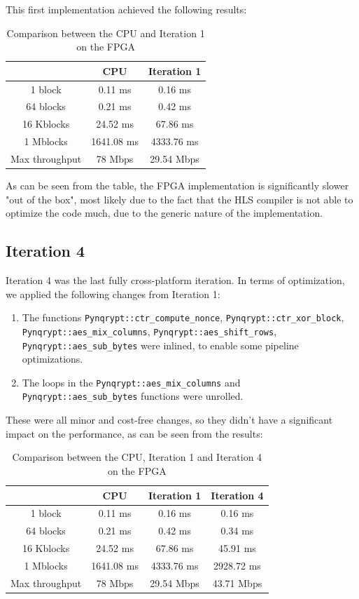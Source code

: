 \documentclass[12pt,oneside,a4paper]{article}
\begin{document}
This first implementation achieved the following results:
\begin{table}[h!]
	\centering
	\begin{tabular}{ccc}
		\toprule
		 & CPU & Iteration 1 \\
		\midrule
		1 block & 0.11 ms & 0.16 ms \\
		64 blocks & 0.21 ms & 0.42 ms \\
		16 Kblocks & 24.52 ms & 67.86 ms \\
		1 Mblocks & 1641.08 ms & 4333.76 ms \\
		Max throughput & 78 Mbps & 29.54 Mbps \\
		\bottomrule
	\end{tabular}
	\caption{Comparison between the CPU and Iteration 1 on the FPGA}
\end{table}

As can be seen from the table, the FPGA implementation is significantly slower "out of the box", most likely due to the fact that the HLS compiler is not able to optimize the code much, due to the generic nature of the implementation.  

\subsection{Iteration 4} \label{subsec:iter4}
Iteration 4 was the last fully cross-platform iteration.
In terms of optimization, we applied the following changes from Iteration 1:
\begin{enumerate}
	\item The functions {\tt Pynqrypt::ctr\_compute\_nonce}, {\tt Pynqrypt::ctr\_xor\_block}, {\tt Pynqrypt::aes\_mix\_columns}, {\tt Pynqrypt::aes\_shift\_rows}, \\ {\tt Pynqrypt::aes\_sub\_bytes} were inlined, to enable some pipeline optimizations.
	\item The loops in the {\tt Pynqrypt::aes\_mix\_columns} and {\tt Pynqrypt::aes\_sub\_bytes} functions were unrolled.
\end{enumerate}

These were all minor and cost-free changes, so they didn't have a significant impact on the performance, as can be seen from the results:
\begin{table}[h!]
	\centering
	\begin{tabular}{cccc}
		\toprule
		 & CPU & Iteration 1 & Iteration 4 \\
		\midrule
		1 block & 0.11 ms & 0.16 ms & 0.16 ms \\
		64 blocks & 0.21 ms & 0.42 ms & 0.34 ms \\
		16 Kblocks & 24.52 ms & 67.86 ms & 45.91 ms \\
		1 Mblocks & 1641.08 ms & 4333.76 ms & 2928.72 ms \\
		Max throughput & 78 Mbps & 29.54 Mbps & 43.71 Mbps \\
		\bottomrule
	\end{tabular}
	\caption{Comparison between the CPU, Iteration 1 and Iteration 4 on the FPGA}
\end{table}
\end{document}
